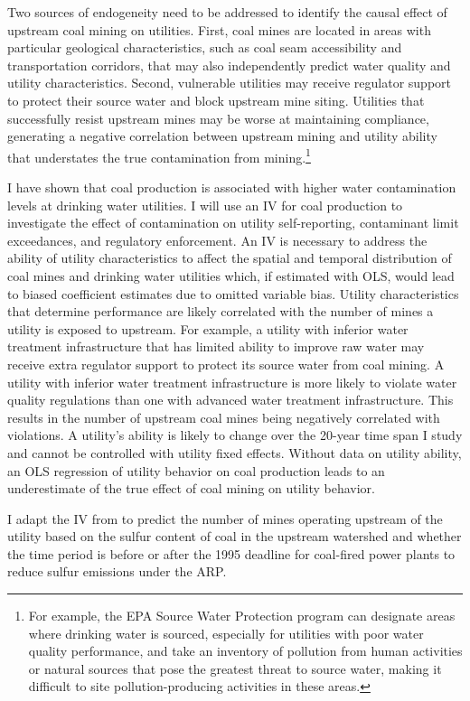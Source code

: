 \documentclass[12pt]{article}
\begin{document}
Two sources of endogeneity need to be addressed to identify the causal effect of upstream coal mining on utilities. First, coal mines are located in areas with particular geological characteristics, such as coal seam accessibility and transportation corridors, that may also independently predict water quality and utility characteristics. Second, vulnerable utilities may receive regulator support to protect their source water and block upstream mine siting. Utilities that successfully resist upstream mines may be worse at maintaining compliance, generating a negative correlation between upstream mining and utility ability that understates the true contamination from mining.\footnote{For example, the EPA Source Water Protection program can designate areas where drinking water is sourced, especially for utilities with poor water quality performance, and take an inventory of pollution from human activities or natural sources that pose the greatest threat to source water, making it difficult to site pollution-producing activities in these areas.}

I have shown that coal production is associated with higher water contamination levels at drinking water utilities. I will use an IV for coal production to investigate the effect of contamination on utility self-reporting, contaminant limit exceedances, and regulatory enforcement. An IV is necessary to address the ability of utility characteristics to affect the spatial and temporal distribution of coal mines and drinking water utilities which, if estimated with OLS, would lead to biased coefficient estimates due to omitted variable bias. Utility characteristics that determine performance are likely correlated with the number of mines a utility is exposed to upstream. For example, a utility with inferior water treatment infrastructure that has limited ability to improve raw water may receive extra regulator support to protect its source water from coal mining. A utility with inferior water treatment infrastructure is more likely to violate water quality regulations than one with advanced water treatment infrastructure. This results in the number of upstream coal mines being negatively correlated with violations. A utility's ability is likely to change over the 20-year time span I study and cannot be controlled with utility fixed effects. Without data on utility ability, an OLS regression of utility behavior on coal production leads to an underestimate of the true effect of coal mining on utility behavior. 

I adapt the IV from \textcite{stratford2015coalprod} to predict the number of mines operating upstream of the utility based on the sulfur content of coal in the upstream watershed and whether the time period is before or after the 1995 deadline for coal-fired power plants to reduce sulfur emissions under the ARP. 
\end{document}
